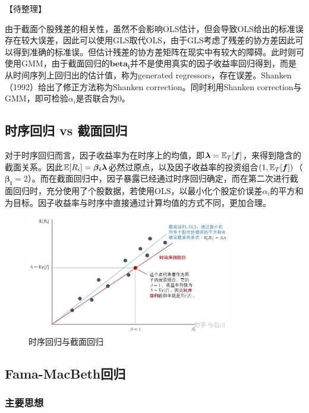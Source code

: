 \documentclass[11pt]{article}
\begin{document}
【待整理】

由于截面个股残差的相关性，虽然不会影响OLS估计，但会导致OLS给出的标准误存在较大误差，因此可以使用GLS取代OLS，由于GLS考虑了残差的协方差因此可以得到准确的标准误。但估计残差的协方差矩阵在现实中有较大的障碍。此时则可使用GMM，由于截面回归的$\bm{beta_i}$并不是使用真实的因子收益率回归得到，而是从时间序列上回归出的估计值，称为generated regressors，存在误差。Shanken（1992）给出了修正方法称为Shanken correction。同时利用Shanken correction与GMM，即可检验$\alpha_i$是否联合为0。

\subsection{时序回归 vs 截面回归}

对于时序回归而言，因子收益率为在时序上的均值，即$\bm{\lambda} = \mathbb{E}_T[\bm{f}]$，来得到隐含的截面关系。因此$\mathbb{E}[R_i] = \bm{\beta_i \lambda}$必然过原点，以及因子收益率的投资组合$(1,\mathbb{E}_T[\bm{f}])$（$\bm{\beta_i}=2$）。而在截面回归中，因子暴露已经通过时序回归确定，而在第二次进行截面回归时，充分使用了个股数据，若使用OLS，以最小化个股定价误差$\alpha_i$的平方和为目标。因子收益率与时序中直接通过计算均值的方式不同，更加合理。

\begin{figure}[H]
    \centering
    \includegraphics[width=0.8\textwidth]{fig/ts_vs_cs.jpg}
    \caption{时序回归与截面回归}
    \label{fig:ts_vs_cs}
\end{figure}

\subsection{Fama-MacBeth回归}

\subsubsection{主要思想}
\end{document}
